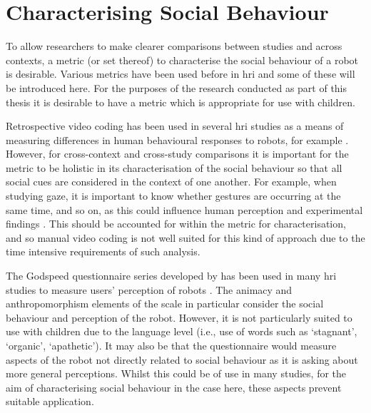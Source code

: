 \section{Characterising Social Behaviour} \label{sec:background-immediacy}
To allow researchers to make clearer comparisons between studies and across contexts, a metric (or set thereof) to characterise the social behaviour of a robot is desirable. Various metrics have been used before in \acrshort{hri} and some of these will be introduced here. For the purposes of the research conducted as part of this thesis it is desirable to have a metric which is appropriate for use with children.

Retrospective video coding has been used in several \acrshort{hri} studies as a means of measuring differences in human behavioural responses to robots, for example \citep{kennedy2015comparing, moshkina2014social, tanaka2012children}. However, for cross-context and cross-study comparisons it is important for the metric to be holistic in its characterisation of the social behaviour so that all social cues are considered in the context of one another. For example, when studying gaze, it is important to know whether gestures are occurring at the same time, and so on, as this could influence human perception and experimental findings \citep{zaki2013cue}. This should be accounted for within the metric for characterisation, and so manual video coding is not well suited for this kind of approach due to the time intensive requirements of such analysis.

The Godspeed questionnaire series developed by \cite{bartneck2009godspeed} has been used in many \acrshort{hri} studies to measure users' perception of robots \citep{bartneck2009does,ham2011influence}. The animacy and anthropomorphism elements of the scale in particular consider the social behaviour and perception of the robot. However, it is not particularly suited to use with children due to the language level (i.e., use of words such as `stagnant', `organic', `apathetic'). It may also be that the questionnaire would measure aspects of the robot not directly related to social behaviour as it is asking about more general perceptions. Whilst this could be of use in many studies, for the aim of characterising social behaviour in the case here, these aspects prevent suitable application.

